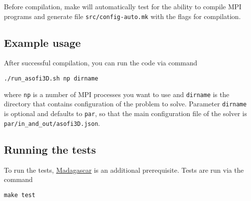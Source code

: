 Before compilation, make will automatically test for the ability to
compile MPI programs and generate file \texttt{src/config-auto.mk} with
the flags for compilation.

\subsection{Example usage}\label{example-usage}

After successful compilation, you can run the code via command

\begin{verbatim}
./run_asofi3D.sh np dirname
\end{verbatim}

where \texttt{np} is a number of MPI processes you want to use and
\texttt{dirname} is the directory that contains configuration of the
problem to solve. Parameter \texttt{dirname} is optional and defaults to
\texttt{par}, so that the main configuration file of the solver is
\texttt{par/in\_and\_out/asofi3D.json}.

\subsection{Running the tests}\label{running-the-tests}

To run the tests, \href{http://www.ahay.org}{Madagascar} is an
additional prerequisite. Tests are run via the command

\begin{verbatim}
make test
\end{verbatim}
